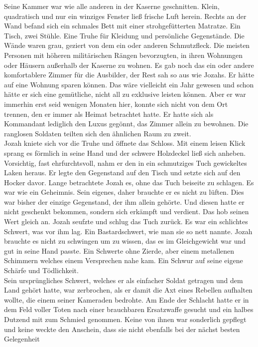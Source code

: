 Seine Kammer war wie alle anderen in der Kaserne geschnitten. Klein, quadratisch und nur ein 
winziges Fenster ließ frische Luft herein. Rechts an der Wand befand sich ein schmales Bett mit 
einer strohgefütterten Matratze. Ein Tisch, zwei Stühle. Eine Truhe für Kleidung und persönliche 
Gegenstände. Die Wände waren grau, geziert von dem ein oder anderen Schmutzfleck. Die meisten 
Personen mit höheren militärischen Rängen bevorzugten, in ihren Wohnungen oder Häusern außerhalb 
der Kaserne zu wohnen. Es gab noch das ein oder andere komfortablere Zimmer für die Ausbilder, der 
Rest sah so aus wie Jozahs. Er hätte auf eine Wohnung sparen können. Das wäre vielleicht ein Jahr 
gewesen und schon hätte er sich eine gemütliche, nicht all zu exklusive leisten können. Aber er war 
immerhin erst seid wenigen Monaten hier, konnte sich nicht von dem Ort trennen, den er immer als 
Heimat betrachtet hatte. Er hatte sich als Kommandant lediglich den Luxus gegönnt, das Zimmer 
allein zu bewohnen. Die ranglosen Soldaten teilten sich den ähnlichen Raum zu zweit. \\
Jozah kniete sich vor die Truhe und öffnete das Schloss. Mit einem leisen Klick sprang es förmlich 
in seine Hand und der schwere Holzdeckel ließ sich anheben. Vorsichtig, fast ehrfurchtsvoll, nahm 
er den in ein schmutziges Tuch gewickeltes Laken heraus. Er legte den Gegenstand auf den Tisch und 
setzte sich auf den Hocker davor. Lange betrachtete Jozah es, ohne das Tuch beiseite zu schlagen. 
Es war wie ein Geheimnis. Sein eigenes, daher brauchte er es nicht zu lüften. Dies war bisher der 
einzige Gegenstand, der ihm allein gehörte. Und diesen hatte er nicht geschenkt bekommen, sondern 
sich erkämpft und verdient. Das hob seinen Wert gleich an. Jozah seufzte und schlug das Tuch zurück. 
Es war ein schlichtes Schwert, was vor ihm lag. Ein Bastardschwert, wie man sie so nett nannte. 
Jozah brauchte es nicht zu schwingen um zu wissen, das es im Gleichgewicht war und gut in seine 
Hand passte. Ein Schwerte ohne Zierde, aber einem metallenen Schimmern welches einem Versprechen 
nahe kam. Ein Schwur auf seine eigene Schärfe und Tödlichkeit. \\
Sein ursprüngliches Schwert, welches er als einfacher Soldat getragen und dem Land gehört 
hatte, war zerbrochen, als er damit die Axt eines Rebellen aufhalten wollte, die einem seiner 
Kameraden bedrohte. Am Ende der Schlacht hatte er in dem Feld voller Toten nach einer brauchbaren 
Ersatzwaffe gesucht und ein halbes Dutzend mit zum Schmied genommen. Keine von ihnen war sonderlich 
gepflegt und keine weckte den Anschein, dass sie nicht ebenfalls bei der nächst besten Gelegenheit 
